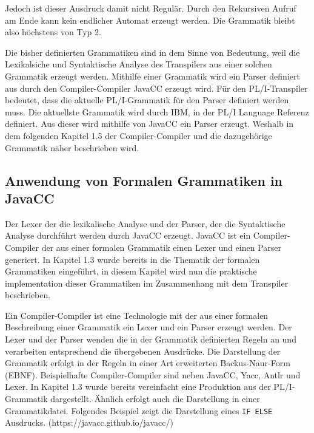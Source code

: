 Jedoch ist dieser Ausdruck damit nicht Regulär. Durch den Rekursiven Aufruf am Ende kann kein endlicher Automat erzeugt werden. Die Grammatik bleibt also höchstens von Typ 2.

	
Die bisher definierten Grammatiken sind in dem Sinne von Bedeutung, weil die Lexikalsiche und Syntaktische Analyse des Transpilers aus einer solchen Grammatik erzeugt werden. Mithilfe einer Grammatik wird ein Parser definiert aus durch den Compiler-Compiler JavaCC erzeugt wird. 
Für den PL/I-Transpiler bedeutet, dass die aktuelle PL/I-Grammatik für den Parser definiert werden muss. Die aktuellste Grammatik wird durch IBM, in der PL/I Language Referenz definiert. Aus dieser wird mithilfe von JavaCC ein Parser erzeugt. Weshalb in dem folgenden Kapitel 1.5 der Compiler-Compiler und die dazugehörige Grammatik näher beschrieben wird.

     
\subsection{Anwendung von Formalen Grammatiken in JavaCC}

Der Lexer der die lexikalische Analyse und der Parser, der die Syntaktische Analyse durchführt werden durch JavaCC erzeugt. 
JavaCC ist ein Compiler-Compiler der aus einer formalen Grammatik einen Lexer und einen Parser generiert. 
In Kapitel 1.3 wurde bereits in die Thematik der formalen Grammatiken eingeführt, in diesem Kapitel wird nun die praktische implementation dieser Grammatiken im Zusammenhang mit dem Transpiler beschrieben.

Ein Compiler-Compiler ist eine Technologie mit der aus einer formalen Beschreibung einer Grammatik ein Lexer und ein Parser erzeugt werden. 
Der Lexer und der Parser wenden die in der Grammatik definierten Regeln an und verarbeiten entsprechend die übergebenen Ausdrücke.
Die Darstellung der Grammatik erfolgt in der Regeln in einer Art erweiterten Backus-Naur-Form (EBNF). 
Beispielhafte Compiler-Compiler sind neben JavaCC, Yacc, Antlr und Lexer.
In Kapitel 1.3 wurde bereits vereinfacht eine Produktion aus der PL/I-Grammatik dargestellt. Ähnlich erfolgt auch die Darstellung in einer Grammatikdatei. Folgendes Beispiel zeigt die Darstellung eines \verb+IF ELSE+ Ausdrucks. 
(https://javacc.github.io/javacc/)

